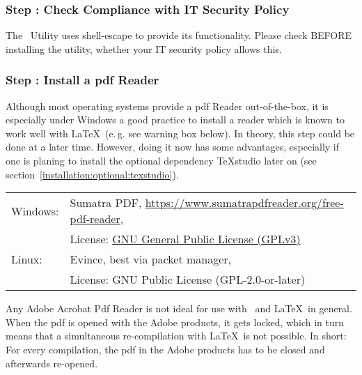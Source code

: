 		\setcounter{step}{1}
		
		\subsubsection{Step \thestep: Check Compliance with IT Security Policy}
			\begin{daWarningBox}
				The \productName~Utility uses shell-escape to provide its functionality. Please check BEFORE installing the utility, whether your IT security policy allows this. 
			\end{daWarningBox}
			\stepcounter{step}
		
		\subsubsection{Step \thestep: Install a pdf Reader}
			\label{subsubsec:install:mandatory:install-pdf-reader}
			Although most operating systems provide a pdf Reader out-of-the-box, it is especially under Windows a good practice to install a reader which is known to work well with \LaTeX~(e.\,g. see warning box below). In theory, this step could be done at a later time. However, doing it now has some advantages, especially if one is planing to install the optional dependency TeXstudio later on (see \mbox{section \ref{installation:optional:texstudio}}).
			\begin{longtable}[c]{ll}
				\rowcolor{white}
				\multicolumn{2}{l}{\textbf{Recommendation:}}\\
				\midrule
				\endfirsthead
				Windows: & Sumatra PDF, \href{https://www.sumatrapdfreader.org/free-pdf-reader}{https://www.sumatrapdfreader.org/free-pdf-reader},\\ 
				& License: \href{https://www.gnu.org/licenses/gpl-3.0.en.html}{GNU General Public License (GPLv3)}\\
				Linux: & Evince, best via packet manager,\\
				& License:  GNU Public License (GPL-2.0-or-later)\\
				\midrule
			\end{longtable}
			
			\begin{daWarningBox}
				Any Adobe Acrobat Pdf Reader is not ideal for use with \mbox{\productName}~and \LaTeX~in general. When the pdf is opened with the Adobe products, it gets locked, which in turn means that a simultaneous re-compilation with \LaTeX~is not possible. In short: For every compilation, the pdf in the Adobe products has to be closed and afterwards re-opened.
			\end{daWarningBox}
			
